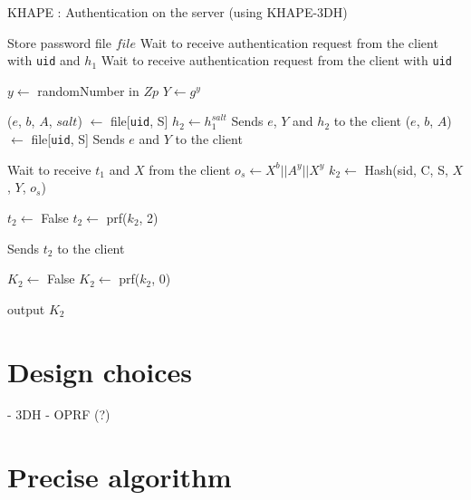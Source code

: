 \documentclass[../report.tex]{subfiles}
\begin{document}
\begin{algorithm}
\caption{KHAPE : Authentication on the server (using KHAPE-3DH)}
\label{euclid}
\begin{algorithmic}
\Require Store password file $file$
    \State Wait to receive authentication request from the client with \verb|uid| and $h_1$
\Else
    \State Wait to receive authentication request from the client with \verb|uid|
\EndIf

\State $y \gets$ randomNumber in $Zp$
\State $Y \gets g^y$

    \State ($e$, $b$, $A$, $salt$) $\gets$ file[\verb|uid|, S] %
    \State $h_2 \gets h_1^{salt}$
    \State Sends $e$, $Y$ and $h_2$ to the client
\Else
    \State ($e$, $b$, $A$) $\gets$ file[\verb|uid|, S] %
    \State Sends $e$ and $Y$ to the client
\EndIf


\State Wait to receive $t_1$ and $X$ from the client
\State $o_s \gets X^b || A^y || X^y$
\State $k_2 \gets$ Hash(sid, C, S, $X$, $Y$, $o_s$)


    \State $t_2 \gets$ False
\Else
    \State $t_2 \gets$ prf($k_2$, 2)
\EndIf


\State Sends $t_2$ to the client


    \State $K_2 \gets$ False
\Else
    \State $K_2 \gets$ prf($k_2$, 0)
\EndIf

\State output $K_2$
\end{algorithmic}
\end{algorithm}






\section{Design choices}
- 3DH
- OPRF (?)


\section{Precise algorithm}
\end{document}
